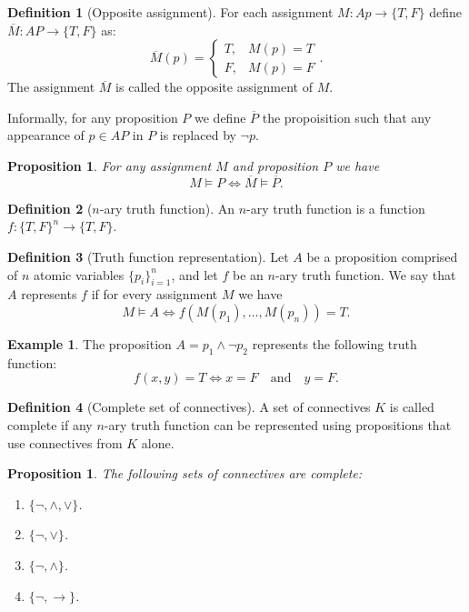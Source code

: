 \documentclass[11pt,a4paper]{article}
\theoremstyle{definition}
\newtheorem{definition}{Definition}[section]
\newtheorem{example}{Example}[section]
\theoremstyle{plain}
\newtheorem{proposition}[theorem]{Proposition}
\newcommand{\tand}{\quad \text{and} \quad}
\renewcommand{\implies}{\rightarrow}
\begin{document}
  \begin{definition}[Opposite assignment]
    For each assignment $M \colon Ap \to \{T, F\}$ 
    define $\overline M \colon AP \to \{T, F\}$ as:
    \[
      \overline M(p) =
      \begin{cases}
        T, &M(p) = T \\
        F, &M(p) = F
      \end{cases}.
    \]
    The assignment $\overline M$ is called the opposite assignment
    of $M$.
  \end{definition}
  
  Informally, for any proposition $P$ we define $\overline P$ the
  propoisition such that any appearance of $p \in AP$ in $P$ is
  replaced by $\neg p$.

  \begin{proposition}
    For any assignment $M$ and proposition $P$ we have
    \[
      M \models P \iff \overline M \models \overline P.
    \]
  \end{proposition}

  \begin{definition}[$n$-ary truth function]
    An $n$-ary truth function is a function
    $f \colon \{T, F\}^n \to \{T, F\}$.
  \end{definition}

  \begin{definition}[Truth function representation]
    Let $A$ be a proposition comprised of $n$ atomic variables
    $\{p_i\}_{i=1}^{n}$, and let $f$ be an $n$-ary truth function.
    We say that $A$ represents $f$ if for every assignment
    $M$ we have
    \[
      M \models A \iff
      f(M(p_1),\dots,M(p_n)) = T.
    \]
  \end{definition}

  \begin{example}
    The proposition $A = p_1 \land \neg p_2$ represents the following
    truth function:
    \[
      f(x,y) = T \iff x = F \tand y = F.
    \]
  \end{example}

  \begin{definition}[Complete set of connectives]
    A set of connectives $K$ is called complete if any $n$-ary truth
    function can be represented using propositions that use connectives from 
    $K$ alone.
  \end{definition}

  \begin{proposition}
    The following sets of connectives are complete:
    \begin{enumerate}
      \item[(1)] $\{\neg, \land, \lor\}$.
      \item[(2)] $\{\neg, \lor\}$.
      \item[(3)] $\{\neg, \land\}$.
      \item[(4)] $\{\neg, \implies\}$.
    \end{enumerate}
  \end{proposition}
\end{document}
